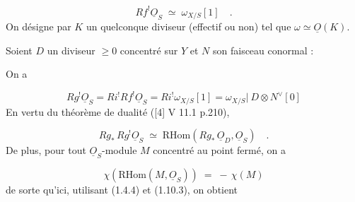 \begin{equation}\tag{1.10.1}
Rf^{!}\underline{O}_S \;\simeq\; \omega_{X/S}[1] \quad .
\end{equation}
On désigne par $K$ un quelconque diviseur (effectif ou non) tel que $\omega \simeq \underline{O}(K)$.

Soient $D$ un diviseur $\geq 0$ concentré sur $Y$ et $N$ son faisceau conormal :

\begin{center}
\end{center}
On a

\begin{equation}\tag{1.10.2}
Rg^{!}\underline{O}_S = Ri^{!}Rf^{!}\underline{O}_S = Ri^{!}\omega_{X/S}[1] = \omega_{X/S}\big|\ D \otimes N^{\vee}[0]
\end{equation}
En vertu du théorème de dualité ([4] V 11.1 p.210),

\begin{equation}\tag{1.10.3}
Rg_{*}\, Rg^{!}\underline{O}_S \;\simeq\; \mathrm{RHom}(Rg_{*}\, \underline{O}_D,\underline{O}_S) \quad .
\end{equation}
De plus, pour tout $\underline{O}_S$-module $M$ concentré au point fermé, on a

\begin{equation}\tag{1.10.4}
\chi(\mathrm{RHom}(M,\underline{O}_S)) \;=\; -\,\chi(M)
\end{equation}
de sorte qu'ici, utilisant (1.4.4) et (1.10.3), on obtient

